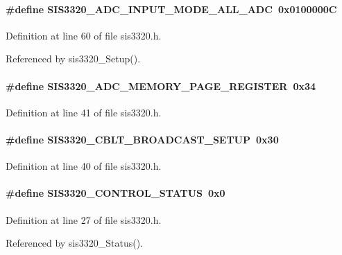 \paragraph[{SIS3320\_\-ADC\_\-INPUT\_\-MODE\_\-ALL\_\-ADC}]{\setlength{\rightskip}{0pt plus 5cm}\#define SIS3320\_\-ADC\_\-INPUT\_\-MODE\_\-ALL\_\-ADC~0x0100000C}\hfill\label{sis3320_8h_a46a6121a82957efb6b9a68b3fc06c7ba}


Definition at line 60 of file sis3320.h.

Referenced by sis3320\_\-Setup().
\paragraph[{SIS3320\_\-ADC\_\-MEMORY\_\-PAGE\_\-REGISTER}]{\setlength{\rightskip}{0pt plus 5cm}\#define SIS3320\_\-ADC\_\-MEMORY\_\-PAGE\_\-REGISTER~0x34}\hfill\label{sis3320_8h_a2e7db596f0180f7bba8cbde0e32d9b52}


Definition at line 41 of file sis3320.h.
\paragraph[{SIS3320\_\-CBLT\_\-BROADCAST\_\-SETUP}]{\setlength{\rightskip}{0pt plus 5cm}\#define SIS3320\_\-CBLT\_\-BROADCAST\_\-SETUP~0x30}\hfill\label{sis3320_8h_a20f60c81b3d0b5a5fbff017724b74892}


Definition at line 40 of file sis3320.h.
\paragraph[{SIS3320\_\-CONTROL\_\-STATUS}]{\setlength{\rightskip}{0pt plus 5cm}\#define SIS3320\_\-CONTROL\_\-STATUS~0x0}\hfill\label{sis3320_8h_a8f6604e053ebf082fc87fb2fea82d0a4}


Definition at line 27 of file sis3320.h.

Referenced by sis3320\_\-Status().

